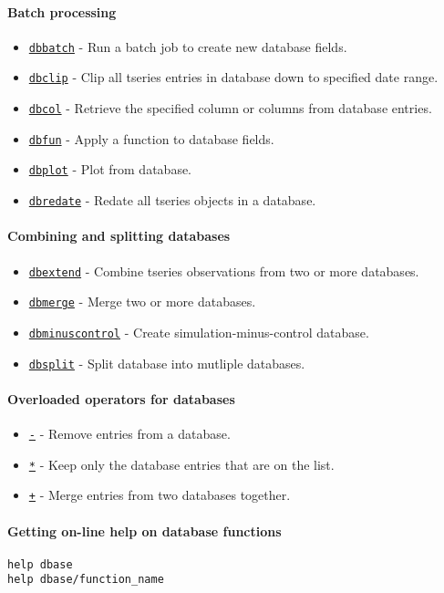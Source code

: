 \paragraph{Batch processing}

\begin{itemize}
\itemsep1pt\parskip0pt
\item
  \href{dbase/dbbatch}{\texttt{dbbatch}} - Run a batch job to create new
  database fields.
\item
  \href{dbase/dbclip}{\texttt{dbclip}} - Clip all tseries entries in
  database down to specified date range.
\item
  \href{dbase/dbcol}{\texttt{dbcol}} - Retrieve the specified column or
  columns from database entries.
\item
  \href{dbase/dbfun}{\texttt{dbfun}} - Apply a function to database
  fields.
\item
  \href{dbase/dbplot}{\texttt{dbplot}} - Plot from database.
\item
  \href{dbase/dbredate}{\texttt{dbredate}} - Redate all tseries objects
  in a database.
\end{itemize}

\paragraph{Combining and splitting
databases}

\begin{itemize}
\itemsep1pt\parskip0pt
\item
  \href{dbase/dbextend}{\texttt{dbextend}} - Combine tseries
  observations from two or more databases.
\item
  \href{dbase/dbmerge}{\texttt{dbmerge}} - Merge two or more databases.
\item
  \href{dbase/dbminuscontrol}{\texttt{dbminuscontrol}} - Create
  simulation-minus-control database.
\item
  \href{dbase/dbsplit}{\texttt{dbsplit}} - Split database into mutliple
  databases.
\end{itemize}

\paragraph{Overloaded operators for
databases}

\begin{itemize}
\itemsep1pt\parskip0pt
\item
  \href{dbase/dbminus}{\texttt{-}} - Remove entries from a database.
\item
  \href{dbase/dbmtimes}{\texttt{*}} - Keep only the database entries
  that are on the list.
\item
  \href{dbase/dbplus}{\texttt{+}} - Merge entries from two databases
  together.
\end{itemize}

\paragraph{Getting on-line help on database
functions}

\begin{verbatim}
help dbase
help dbase/function_name
\end{verbatim}



